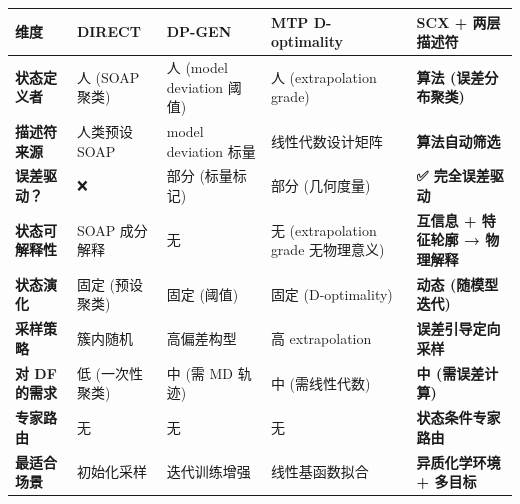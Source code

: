 \documentclass[
  12pt,
]{ctexart}
\begin{document}
\begin{longtable}[]{@{}
  >{\raggedright\arraybackslash}p{}
  >{\raggedright\arraybackslash}p{}
  >{\raggedright\arraybackslash}p{}
  >{\raggedright\arraybackslash}p{}
  >{\raggedright\arraybackslash}p{}@{}}
\toprule\noalign{}
\begin{minipage}[b]{\linewidth}\raggedright
维度
\end{minipage} & \begin{minipage}[b]{\linewidth}\raggedright
DIRECT
\end{minipage} & \begin{minipage}[b]{\linewidth}\raggedright
DP-GEN
\end{minipage} & \begin{minipage}[b]{\linewidth}\raggedright
MTP D-optimality
\end{minipage} & \begin{minipage}[b]{\linewidth}\raggedright
\textbf{SCX + 两层描述符}
\end{minipage} \\
\midrule\noalign{}
\endhead
\bottomrule\noalign{}
\endlastfoot
\textbf{状态定义者} & 人 (SOAP 聚类) & 人 (model deviation 阈值) & 人
(extrapolation grade) & \textbf{算法 (误差分布聚类)} \\
\textbf{描述符来源} & 人类预设 SOAP & model deviation 标量 &
线性代数设计矩阵 & \textbf{算法自动筛选} \\
\textbf{误差驱动？} & ❌ & 部分 (标量标记) & 部分 (几何度量) &
\textbf{✅ 完全误差驱动} \\
\textbf{状态可解释性} & SOAP 成分解释 & 无 & 无 (extrapolation grade
无物理意义) & \textbf{互信息 + 特征轮廓 → 物理解释} \\
\textbf{状态演化} & 固定 (预设聚类) & 固定 (阈值) & 固定 (D-optimality)
& \textbf{动态 (随模型迭代)} \\
\textbf{采样策略} & 簇内随机 & 高偏差构型 & 高 extrapolation &
\textbf{误差引导定向采样} \\
\textbf{对 DF 的需求} & 低 (一次性聚类) & 中 (需 MD 轨迹) & 中
(需线性代数) & \textbf{中 (需误差计算)} \\
\textbf{专家路由} & 无 & 无 & 无 & \textbf{状态条件专家路由} \\
\textbf{最适合场景} & 初始化采样 & 迭代训练增强 & 线性基函数拟合 &
\textbf{异质化学环境 + 多目标} \\
\end{longtable}
\end{document}
